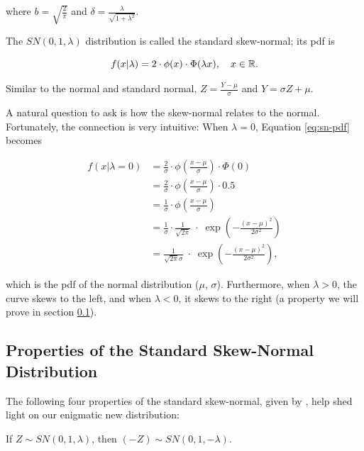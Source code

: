 \documentclass{article}
\begin{document}
where $b = \sqrt{\frac{2}{\pi}}$ and $\delta = \frac{\lambda}{\sqrt{1 +
\lambda^2}}$.

The $SN(0,1,\lambda)$ distribution is called the standard skew-normal; its pdf
is

\begin{equation} \label{eq:standard-sn-pdf}
  f(x|\lambda) = 2 \cdot \phi(x) \cdot \Phi (\lambda x), \quad x \in \mathbb{R}.
\end{equation}

Similar to the normal and standard normal, $Z = \frac{Y - \mu}{\sigma}$ and $Y
= \sigma Z + \mu$.

A natural question to ask is how the skew-normal relates to the normal.
Fortunately, the connection is very intuitive: When $\lambda = 0$, Equation
\eqref{eq:sn-pdf} becomes

\begin{align*}
  f(x|\lambda=0) &= \frac2\sigma \cdot \phi \left( \frac{x-\mu}{\sigma} \right) \cdot \Phi(0) \\
  &= \frac2\sigma \cdot \phi \left( \frac{x-\mu}{\sigma} \right) \cdot 0.5 \\
  &= \frac1\sigma \cdot \phi \left( \frac{x-\mu}{\sigma} \right) \\
  &= \frac1\sigma \cdot \frac{1}{\sqrt{2\pi}} \;\cdot\; \exp \left( -\frac{(x-\mu)^2}{2\sigma^2} \right) \\
  &= \frac{1}{\sqrt{2\pi}\sigma} \;\cdot\; \exp \left( -\frac{(x-\mu)^2}{2\sigma^2} \right),
\end{align*}

which is the pdf of the normal distribution ($\mu$, $\sigma$). Furthermore,
when $\lambda > 0$, the curve skews to the left, and when $\lambda < 0$, it
skews to the right (a property we will prove in section
\ref{subsec:four-properties}).

\subsection{Properties of the Standard Skew-Normal Distribution}
\label{subsec:four-properties}

The following four properties of the standard skew-normal, given by
\citet{main}, help shed light on our enigmatic new distribution:

\begin{property} \label{prop:1}
  If $Z \sim SN(0, 1, \lambda)$, then $(-Z) \sim SN(0, 1, -\lambda)$.
\end{property}
\end{document}
